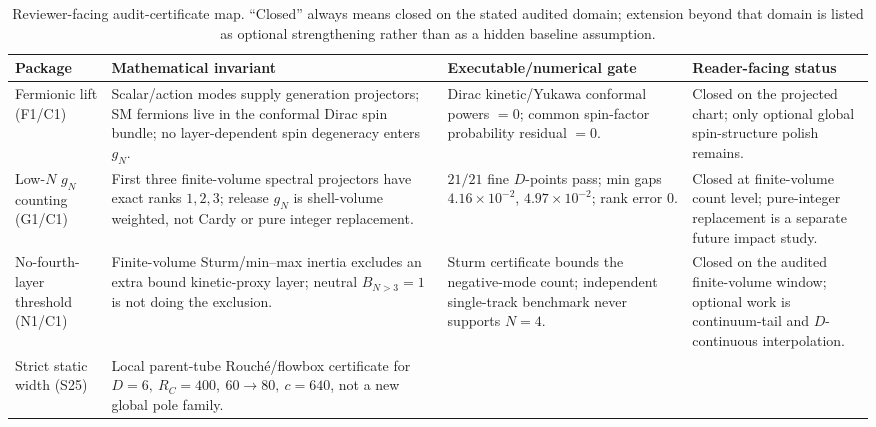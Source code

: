 \documentclass[aps,prd,onecolumn,notitlepage,nofootinbib,superscriptaddress,11pt,floatfix]{revtex4-2}
\begin{document}
\begin{table}[htbp]
\centering
\caption{Reviewer-facing audit-certificate map.  ``Closed'' always means closed on the stated audited domain; extension beyond that domain is listed as optional strengthening rather than as a hidden baseline assumption.}
\label{tab:audit_certificate_map}
\tiny
\setlength{\tabcolsep}{2pt}
\renewcommand{\arraystretch}{0.92}
\begin{tabular}{@{}l l l l@{}}
\toprule
\parbox[t]{0.15\textwidth}{\textbf{Package}} & \parbox[t]{0.27\textwidth}{\textbf{Mathematical invariant}} & \parbox[t]{0.26\textwidth}{\textbf{Executable/numerical gate}} & \parbox[t]{0.22\textwidth}{\textbf{Reader-facing status}} \\
\midrule
\parbox[t]{0.15\textwidth}{Fermionic lift (F1/C1)} &
\parbox[t]{0.27\textwidth}{Scalar/action modes supply generation projectors; SM fermions live in the conformal Dirac spin bundle; no layer-dependent spin degeneracy enters \(g_N\).} &
\parbox[t]{0.26\textwidth}{Dirac kinetic/Yukawa conformal powers \(=0\); common spin-factor probability residual \(=0\).} &
\parbox[t]{0.22\textwidth}{Closed on the projected chart; only optional global spin-structure polish remains.} \\
\addlinespace
\parbox[t]{0.15\textwidth}{Low-\(N\) \(g_N\) counting (G1/C1)} &
\parbox[t]{0.27\textwidth}{First three finite-volume spectral projectors have exact ranks \(1,2,3\); release \(g_N\) is shell-volume weighted, not Cardy or pure integer replacement.} &
\parbox[t]{0.26\textwidth}{\(21/21\) fine \(D\)-points pass; min gaps \(4.16\times10^{-2}\), \(4.97\times10^{-2}\); rank error \(0\).} &
\parbox[t]{0.22\textwidth}{Closed at finite-volume count level; pure-integer replacement is a separate future impact study.} \\
\addlinespace
\parbox[t]{0.15\textwidth}{No-fourth-layer threshold (N1/C1)} &
\parbox[t]{0.27\textwidth}{Finite-volume Sturm/min--max inertia excludes an extra bound kinetic-proxy layer; neutral \(B_{N>3}=1\) is not doing the exclusion.} &
\parbox[t]{0.26\textwidth}{Sturm certificate bounds the negative-mode count; independent single-track benchmark never supports \(N=4\).} &
\parbox[t]{0.22\textwidth}{Closed on the audited finite-volume window; optional work is continuum-tail and \(D\)-continuous interpolation.} \\
\addlinespace
\parbox[t]{0.15\textwidth}{Strict static width (S25)} &
\parbox[t]{0.27\textwidth}{Local parent-tube Rouch\'e/flowbox certificate for \(D=6,\ R_C=400,\ 60\to80,\ c=640\), not a new global pole family.} &

\end{tabular}
\end{table}
\end{document}
